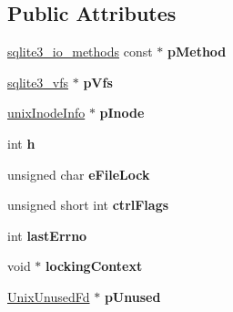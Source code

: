 \subsection*{Public Attributes}
\begin{DoxyCompactItemize}
\item 
\hyperlink{structsqlite3__io__methods}{sqlite3\+\_\+io\+\_\+methods} const $\ast$ {\bfseries p\+Method}\hypertarget{structunixFile_a2a2b40e965f91aa9ee21135bfb0c17ec}{}\label{structunixFile_a2a2b40e965f91aa9ee21135bfb0c17ec}

\item 
\hyperlink{structsqlite3__vfs}{sqlite3\+\_\+vfs} $\ast$ {\bfseries p\+Vfs}\hypertarget{structunixFile_a048d696479bb2544ab2cec1ac9a75d67}{}\label{structunixFile_a048d696479bb2544ab2cec1ac9a75d67}

\item 
\hyperlink{structunixInodeInfo}{unix\+Inode\+Info} $\ast$ {\bfseries p\+Inode}\hypertarget{structunixFile_ac17292fe29bb6cc9eceed9db6d1209e8}{}\label{structunixFile_ac17292fe29bb6cc9eceed9db6d1209e8}

\item 
int {\bfseries h}\hypertarget{structunixFile_a1c58798d4ff3ac6232765c8b76bb7450}{}\label{structunixFile_a1c58798d4ff3ac6232765c8b76bb7450}

\item 
unsigned char {\bfseries e\+File\+Lock}\hypertarget{structunixFile_a001e59bdb9d3f396952c2c8e3229f7fc}{}\label{structunixFile_a001e59bdb9d3f396952c2c8e3229f7fc}

\item 
unsigned short int {\bfseries ctrl\+Flags}\hypertarget{structunixFile_a05d9d0af8aa4d9de6a250984cc12ae56}{}\label{structunixFile_a05d9d0af8aa4d9de6a250984cc12ae56}

\item 
int {\bfseries last\+Errno}\hypertarget{structunixFile_afde57c2e118fac8041918dac2ee6f7d1}{}\label{structunixFile_afde57c2e118fac8041918dac2ee6f7d1}

\item 
void $\ast$ {\bfseries locking\+Context}\hypertarget{structunixFile_afaeb4425a6de3e913db4b03e8a0d098a}{}\label{structunixFile_afaeb4425a6de3e913db4b03e8a0d098a}

\item 
\hyperlink{structUnixUnusedFd}{Unix\+Unused\+Fd} $\ast$ {\bfseries p\+Unused}\hypertarget{structunixFile_a3820ccead5805d2ea61ca1c752646852}{}\label{structunixFile_a3820ccead5805d2ea61ca1c752646852}


\end{DoxyCompactItemize}
